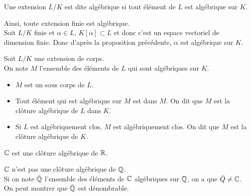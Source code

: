 \begin{definition}
	Une extension $L/K$ est dite algébrique si tout élément de $L$ est algébrique sur $K$.\\
\end{definition}

\begin{remarque}
	Ainsi, toute extension finie est algébrique.\\
	Soit $L/K$ finie et $\alpha \in L$, $K[\alpha] \subset L$ et donc c'est un espace vectoriel de dimension finie. Donc d'après la proposition précédente, $\alpha$ est algébrique sur $K$.
\end{remarque}

\begin{theorem}
	Soit $L/K$ une extension de corps.\\
	On note $M$ l'ensemble des éléments de $L$ qui sont algébriques sur $K$.
	\begin{itemize}
		\item $M$ est un sous corps de $L$.
		\item Tout élément qui est algébrique sur $M$ est dans $M$. On dit que $M$ est la clôture algébrique de $L$ dans $K$.
		\item Si $L$ est algébriquement clos, $M$ est algébriquement clos. On dit que $M$ est la clôture algébrique de $K$.
	\end{itemize}
\end{theorem}

\begin{example}
	$\mathbb{C}$ est une clôture algébrique de $\mathbb{R}$.
\end{example}

\begin{example}
	$\mathbb{C}$ n'est pas une clôture algébrique de $\mathbb{Q}$. \\
	Si on note $\bar{\mathbb{Q}}$ l'ensemble des éléments de $\mathbb{C}$ algébriques sur $\mathbb{Q}$, on a que $\bar{Q} \neq \mathbb{C}$. On peut montrer que $\bar{\mathbb{Q}}$ est dénombrable.
\end{example}

